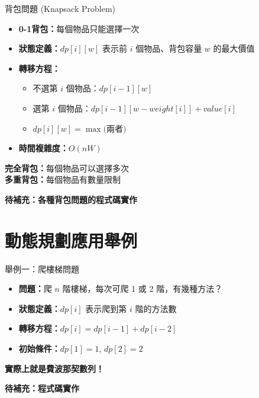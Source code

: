 \documentclass{beamer}
\begin{document}
\begin{frame}{背包問題 (Knapsack Problem)}
\begin{itemize}
    \item \textbf{0-1背包：}每個物品只能選擇一次
    \item \textbf{狀態定義：}$dp[i][w]$ 表示前 $i$ 個物品、背包容量 $w$ 的最大價值
    \item \textbf{轉移方程：}
    \begin{itemize}
        \item 不選第 $i$ 個物品：$dp[i-1][w]$
        \item 選第 $i$ 個物品：$dp[i-1][w-weight[i]] + value[i]$
        \item $dp[i][w] = \max($兩者$)$
    \end{itemize}
    \item \textbf{時間複雜度：}$O(nW)$
\end{itemize}

\vspace{1em}
\textbf{完全背包：}每個物品可以選擇多次\\
\textbf{多重背包：}每個物品有數量限制

\vspace{1em}
\textbf{待補充：各種背包問題的程式碼實作}
\end{frame}

\section{動態規劃應用舉例}

\begin{frame}{舉例一：爬樓梯問題}
\begin{itemize}
    \item \textbf{問題：}爬 $n$ 階樓梯，每次可爬 1 或 2 階，有幾種方法？
    \item \textbf{狀態定義：}$dp[i]$ 表示爬到第 $i$ 階的方法數
    \item \textbf{轉移方程：}$dp[i] = dp[i-1] + dp[i-2]$
    \item \textbf{初始條件：}$dp[1] = 1$, $dp[2] = 2$
\end{itemize}

\vspace{1em}
\textbf{實際上就是費波那契數列！}

\vspace{1em}
\textbf{待補充：程式碼實作}
\end{frame}
\end{document}
